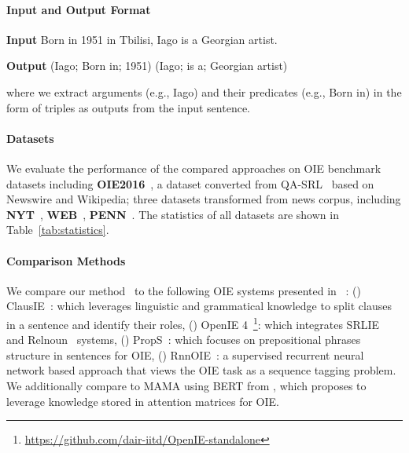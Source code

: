 \paragraph{Input and Output Format}
\begin{enumerate*}
    \item[] {\bf Input} Born in 1951 in Tbilisi, Iago is a Georgian artist.
    \item[] {\bf Output} (Iago; Born in; 1951) (Iago; is a; Georgian artist)
\end{enumerate*}

\noindent where we extract arguments (e.g., Iago) and their predicates (e.g., Born in) in the form of triples as outputs from the input sentence.

\paragraph{Datasets} We evaluate the performance of the compared approaches on OIE benchmark datasets including {\bf OIE2016}~\cite{stanovsky2016creating}, a dataset converted from QA-SRL~\cite{he2015question} based on Newswire and Wikipedia; three datasets transformed from news corpus, including {\bf NYT}~\cite{mesquita2013effectiveness}, {\bf WEB}~\cite{mesquita2013effectiveness}, {\bf PENN}~\cite{xu2013open}. The statistics of all datasets are shown in Table~\ref{tab:statistics}. 

\paragraph{Comparison Methods} We compare our method \method\ to the following OIE systems presented in ~\cite{stanovsky2018supervised}: (\expandafter{}) ClausIE~\cite{del2013clausie}: which leverages linguistic and grammatical knowledge to split clauses in a sentence and identify their roles, (\expandafter{}) OpenIE 4~\footnote{\label{ft:openie51}\tiny\url{https://github.com/dair-iitd/OpenIE-standalone}}: which integrates SRLIE~\cite{christensen2011analysis} and Relnoun~\cite{pal2016demonyms} systems, (\expandafter{}) PropS~\cite{stanovsky2016getting}: which focuses on prepositional phrases structure in sentences for OIE, (\expandafter{}) RnnOIE~\cite{stanovsky2018supervised}: a supervised recurrent neural network based approach that views the OIE task as a sequence tagging problem. We additionally compare to MAMA using BERT from \cite{wang2020language}, which proposes to leverage knowledge stored in attention matrices for OIE.

